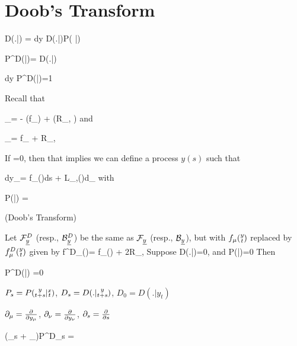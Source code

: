 \section{Doob's Transform}

\beq
D(.|)
=
\int dy\; D(.|)P( |)
\eeq

\beq
P^D(|)=
{D(.|)}
\eeq

\beq 
\int dy\; P^D(|)=1
\eeq






Recall that

\beq
\calf_\rvx \bullet=
-\;
(\bullet f_\mu) + 
(\bullet R_{\mu, \nu})
\eeq
and

\beq
\calb_\rvx \bullet=
f_\mu{}
 + R_{\mu, \nu}
\eeq

If
\beq
{} \phi{}=0,
\eeq
then that implies we can define a process $y(s)$
such that

\beq
dy_\mu = f_\mu()ds + L_{\mu,\nu}()d\rvB_\nu
\eeq
with 

\beq 
P(|) =\phi{}
\eeq


\begin{claim} (Doob's Transform)
 \label{cl-doobs-transform}
 
Let ${\cal F}_{\underline{y}}^D$ (resp.,   
${\cal B}_{\underline{y}}^{D}$) be the 
	same as ${\cal F}_{\underline{y}}$ (resp., 
	${\cal B}_{\underline{y}}$), but with $f_\mu(\substack{y\\t})$
	replaced by $f^D_\mu(\substack{y\\t})$
		given by
		\beq
		f^D_\mu()=
		f_\mu() +
		2R_{\mu, \nu}
		\eeq
Suppose
\beq
{} D(.|)=0,
\eeq
and
\beq
{} 
P(|)=0
\eeq
Then
	
\beq
{}
P^D(|)
=0
\eeq

	
\end{claim}
\proof

$P_s=P(\substack{y\\t+s}|\substack{x\\t})$, $D_s=D(.|\substack{y\\t+s})$, $D_0=D(.|y_{t})$

$\partial_\mu=\frac{\partial}{\partial y_\mu}$,
$\partial_\nu=\frac{\partial}{\partial y_\nu}$,
$\partial_s=\frac{\partial}{\partial s}$




\beq
(\partial_s + \calb_\rvy)P^D_s
=
\eeq


